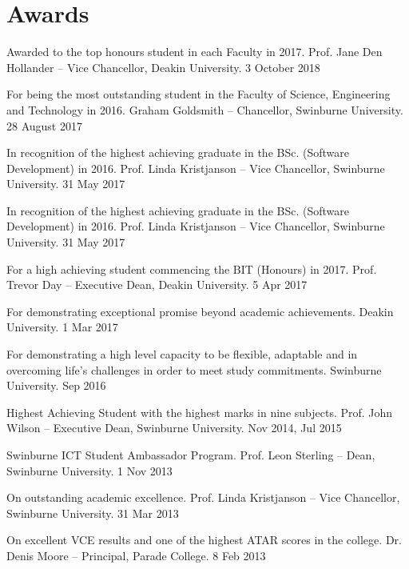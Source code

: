 \section{Awards}

{Awarded to the top honours student in each Faculty in 2017.}
{Prof. Jane Den Hollander -- Vice Chancellor, Deakin University.}
{3 October 2018}

{For being the most outstanding student in the Faculty of Science, Engineering and Technology in 2016.}
{Graham Goldsmith -- Chancellor, Swinburne University.}
{28 August 2017}

{In recognition of the highest achieving graduate in the BSc. (Software Development) in 2016.}
{Prof. Linda Kristjanson -- Vice Chancellor, Swinburne University.}
{31 May 2017}

{In recognition of the highest achieving graduate in the BSc. (Software Development) in 2016.}
{Prof. Linda Kristjanson -- Vice Chancellor, Swinburne University.}
{31 May 2017}

{For a high achieving student commencing the BIT (Honours) in 2017.}
{Prof. Trevor Day -- Executive Dean, Deakin University.}
{5 Apr 2017}

{For demonstrating exceptional promise beyond academic achievements.}
{Deakin University.}
{1 Mar 2017}


{For demonstrating a high level capacity to be flexible, adaptable and in overcoming life's challenges in order to meet study commitments.}
{Swinburne University.}
{Sep 2016}

{Highest Achieving Student with the highest marks in nine subjects.}
{Prof. John Wilson -- Executive Dean, Swinburne University.}
{Nov 2014, Jul 2015}

{Swinburne ICT Student Ambassador Program.}
{Prof. Leon Sterling -- Dean, Swinburne University.}
{1 Nov 2013}

{On outstanding academic excellence.}
{Prof. Linda Kristjanson -- Vice Chancellor, Swinburne University.}
{31 Mar 2013}

{On excellent VCE results and one of the highest ATAR scores in the college.}
{Dr. Denis Moore -- Principal, Parade College.}
{8 Feb 2013}
